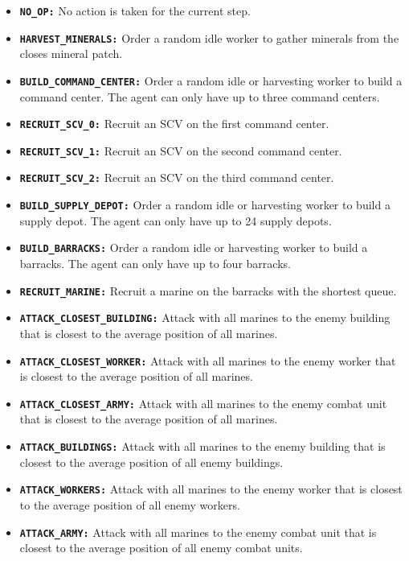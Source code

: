 \begin{itemize}
    \item \textbf{\texttt{NO\_OP:}} No action is taken for the current step.
    \item \textbf{\texttt{HARVEST\_MINERALS:}} Order a random idle worker to gather minerals from the closes mineral patch.
    \item \textbf{\texttt{BUILD\_COMMAND\_CENTER:}} Order a random idle or harvesting worker to build a command center. The agent can only have up to three command centers.
    \item \textbf{\texttt{RECRUIT\_SCV\_0:}} Recruit an SCV on the first command center.
    \item \textbf{\texttt{RECRUIT\_SCV\_1:}} Recruit an SCV on the second command center.
    \item \textbf{\texttt{RECRUIT\_SCV\_2:}} Recruit an SCV on the third command center.
    \item \textbf{\texttt{BUILD\_SUPPLY\_DEPOT:}} Order a random idle or harvesting worker to build a supply depot. The agent can only have up to 24 supply depots.
    \item \textbf{\texttt{BUILD\_BARRACKS:}} Order a random idle or harvesting worker to build a barracks. The agent can only have up to four barracks.
    \item \textbf{\texttt{RECRUIT\_MARINE:}} Recruit a marine on the barracks with the shortest queue.
    \item \textbf{\texttt{ATTACK\_CLOSEST\_BUILDING:}} Attack with all marines to the enemy building that is closest to the average position of all marines.
    \item \textbf{\texttt{ATTACK\_CLOSEST\_WORKER:}} Attack with all marines to the enemy worker that is closest to the average position of all marines.
    \item \textbf{\texttt{ATTACK\_CLOSEST\_ARMY:}} Attack with all marines to the enemy combat unit that is closest to the average position of all marines.
    \item \textbf{\texttt{ATTACK\_BUILDINGS:}} Attack with all marines to the enemy building that is closest to the average position of all enemy buildings.
    \item \textbf{\texttt{ATTACK\_WORKERS:}} Attack with all marines to the enemy worker that is closest to the average position of all enemy workers.
    \item \textbf{\texttt{ATTACK\_ARMY:}} Attack with all marines to the enemy combat unit that is closest to the average position of all enemy combat units.
\end{itemize}

